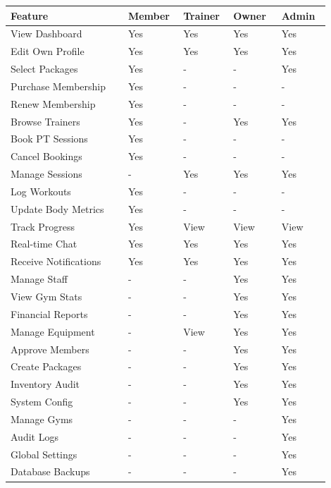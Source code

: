 \documentclass[
  12pt,
  a4paperpaper,
]{report}
\newcounter{none} %
\begin{document}
{\def\LTcaptype{none} %
\begin{longtable}[]{@{}
  >{\raggedright\arraybackslash}p{0.34\linewidth}
  >{\centering\arraybackslash}p{0.14\linewidth}
  >{\centering\arraybackslash}p{0.14\linewidth}
  >{\centering\arraybackslash}p{0.14\linewidth}
  >{\centering\arraybackslash}p{0.14\linewidth}@{}}
\hline
Feature & Member & Trainer & Owner & Admin \\
\hline
\endhead
\hline
\endlastfoot
View Dashboard & Yes & Yes & Yes & Yes \\
Edit Own Profile & Yes & Yes & Yes & Yes \\
Select Packages & Yes & - & - & Yes \\
Purchase Membership & Yes & - & - & - \\
Renew Membership & Yes & - & - & - \\
Browse Trainers & Yes & - & Yes & Yes \\
Book PT Sessions & Yes & - & - & - \\
Cancel Bookings & Yes & - & - & - \\
Manage Sessions & - & Yes & Yes & Yes \\
Log Workouts & Yes & - & - & - \\
Update Body Metrics & Yes & - & - & - \\
Track Progress & Yes & View & View & View \\
Real-time Chat & Yes & Yes & Yes & Yes \\
Receive Notifications & Yes & Yes & Yes & Yes \\
Manage Staff & - & - & Yes & Yes \\
View Gym Stats & - & - & Yes & Yes \\
Financial Reports & - & - & Yes & Yes \\
Manage Equipment & - & View & Yes & Yes \\
Approve Members & - & - & Yes & Yes \\
Create Packages & - & - & Yes & Yes \\
Inventory Audit & - & - & Yes & Yes \\
System Config & - & - & Yes & Yes \\
Manage Gyms & - & - & - & Yes \\
Audit Logs & - & - & - & Yes \\
Global Settings & - & - & - & Yes \\
Database Backups & - & - & - & Yes \\
\end{longtable}
}
\end{document}
